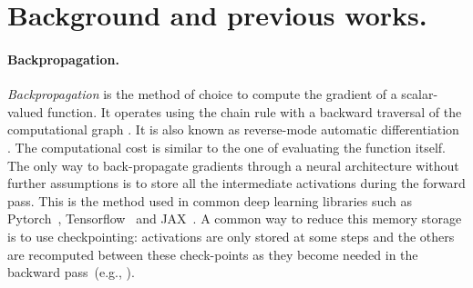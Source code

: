 \documentclass{article}
\begin{document}
\section{Background and previous works.}

\paragraph{Backpropagation.}
\textit{Backpropagation} is the method of choice to compute the gradient of a scalar-valued function.
It operates using the chain rule with a backward traversal of the computational graph \citep{Computational_Graphs}. It is also known as reverse-mode automatic differentiation \citep{baydin2015automatic, 1986Natur.323..533R,verma2000introduction, doi:10.1137/1.9780898717761}. The computational cost is similar to the one of evaluating the function itself. The only way to back-propagate gradients through a neural architecture without further assumptions is to store all the intermediate activations during the forward pass. This is the method used in common deep learning libraries such as Pytorch~\citep{paszke2017automatic}, Tensorflow~\citep{tensorflow2015-whitepaper} and JAX~\citep{jacobsen2018irevnet}. A common way to reduce this memory storage is to use checkpointing: activations are only stored at some steps and the others are recomputed between these check-points as they become needed in the backward pass~(e.g., \citet{martens2012training}).
\vspace{-1em}
\end{document}
